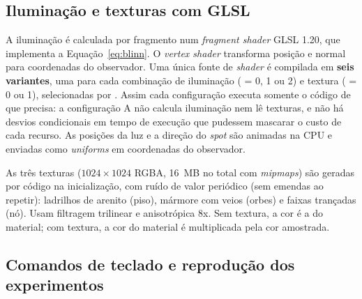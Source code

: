 \documentclass[12pt,a4paper]{article}
\newcommand{\code}[1]{\texttt{\detokenize{#1}}}
\begin{document}
\subsection{Iluminação e texturas com GLSL}

A iluminação é calculada por fragmento num \emph{fragment shader} GLSL 1.20, que implementa a
Equação~\eqref{eq:blinn}. O \emph{vertex shader} transforma posição e normal para coordenadas do
observador. Uma única fonte de \emph{shader} é compilada em \textbf{seis variantes}, uma para cada
combinação de iluminação (\code{ILUMINACAO} = 0, 1 ou 2) e textura (\code{TEXTURA} = 0 ou 1),
selecionadas por \code{\#define}. Assim cada configuração executa somente o código de que precisa:
a configuração A não calcula iluminação nem lê texturas, e não há desvios condicionais em tempo de
execução que pudessem mascarar o custo de cada recurso. As posições da luz e a direção do \emph{spot}
são animadas na CPU e enviadas como \emph{uniforms} em coordenadas do observador.

As três texturas ($1024\times1024$ RGBA, 16~MB no total com \emph{mipmaps}) são geradas por código
na inicialização, com ruído de valor periódico (sem emendas ao repetir): ladrilhos de arenito
(piso), mármore com veios (orbes) e faixas trançadas (nó). Usam filtragem trilinear e anisotrópica
8x. Sem textura, a cor é a do material; com textura, a cor do material é multiplicada pela cor
amostrada.

\subsection{Comandos de teclado e reprodução dos experimentos}
\end{document}
